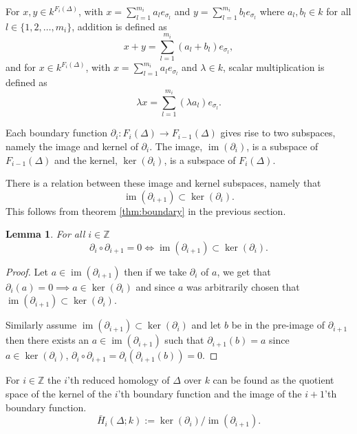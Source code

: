 \documentclass[11pt,a4paper,twoside, openright]{report}
\newtheorem{mylem}[mythm]{Lemma}
\DeclareMathOperator{\im}{im}
\begin{document}
For $x,y\in k^{F_i(\Delta)}$, with $x = \sum_{l=1}^{m_i}a_le_{\sigma_l}$ and $y = \sum_{l=1}^{m_i}b_le_{\sigma_l}$ where $a_l,b_l\in k$ for all $l\in\{1,2,\dots,m_i\}$, addition is defined as 
\begin{equation*}
x+y = \sum_{l=1}^{m_i}(a_l+b_l)e_{\sigma_l},
\end{equation*}
and for $x\in k^{F_i(\Delta)}$, with $x = \sum_{l=1}^{m_i}a_le_{\sigma_l}$ and $\lambda \in k$, scalar multiplication is defined as 
\begin{equation*}
\lambda x = \sum_{l=1}^{m_i}(\lambda a_l)e_{\sigma_l}.
\end{equation*}

Each boundary function $\partial_i:F_i(\Delta)\to F_{i-1}(\Delta)$ gives rise to two subspaces, namely the image and kernel of $\partial_i$. The image, $\im(\partial_i)$, is a subspace of $F_{i-1}(\Delta)$ and the kernel, $\ker(\partial_i)$, is a subspace of $F_{i}(\Delta)$. 

There is a relation between these image and kernel subspaces, namely that 
\begin{equation*}
\im(\partial_{i+1})\subset\ker(\partial_i).
\end{equation*}
This follows from theorem \ref{thm:boundary} in the previous section.
\begin{mylem}\label{lem:subset}
For all $i\in\mathbb{Z}$ 
\begin{equation*}
\partial_i\circ\partial_{i+1}=0 \Leftrightarrow \im(\partial_{i+1})\subset\ker(\partial_i).
\end{equation*}
\end{mylem}
\begin{proof}
Let $a\in \im(\partial_{i+1})$ then if we take $\partial_i$ of $a$, we get that $\partial_i(a)=0\implies a\in \ker(\partial_i)$ and since $a$ was arbitrarily chosen that $\im(\partial_{i+1})\subset \ker(\partial_i)$. 

Similarly assume $\im(\partial_{i+1})\subset \ker(\partial_i)$ and let $b$ be in the pre-image of $\partial_{i+1}$ then there exists an $a\in\im(\partial_{i+1})$ such that 
$\partial_{i+1}(b)=a$ since $a\in\ker(\partial_i)$, $\partial_i\circ\partial_{i+1}=\partial_i(\partial_{i+1}(b))=0$. 
\end{proof}


For $i\in\mathbb{Z}$ the $i$'th reduced homology of $\Delta$ over $k$ can be found as the quotient space of the kernel of the $i$'th boundary function and the image of the $i+1$'th boundary function. \cite[p.2]{Allgaier}
\begin{equation}
\bar{H}_i(\Delta;k):=\ker(\partial_i)/\im(\partial_{i+1}).
\end{equation}
\end{document}
